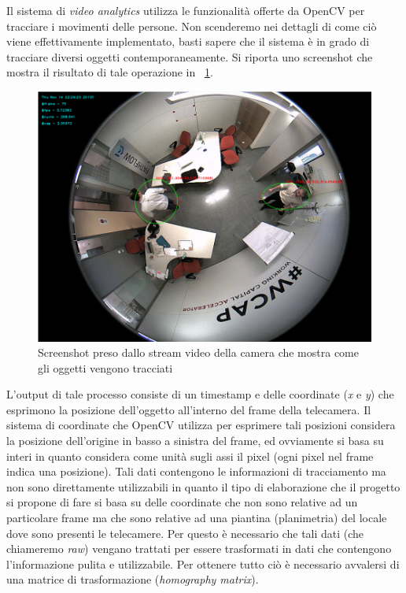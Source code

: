 Il sistema di \textit{video analytics} utilizza le funzionalità offerte da OpenCV per tracciare i movimenti delle persone. Non scenderemo nei dettagli di come ciò viene effettivamente implementato, basti sapere che il sistema è in grado di tracciare diversi oggetti contemporaneamente. Si riporta uno screenshot che mostra il risultato di tale operazione in ~\ref{fig:track1}.
\begin{figure}[htpb] 
\centering 
\includegraphics[scale=0.4]{./images/track1.png} 
\caption{Screenshot preso dallo stream video della camera che mostra come gli oggetti vengono tracciati} 
\label{fig:track1}
\end{figure} 
 L'output di tale processo consiste di un timestamp e delle coordinate (\textit{x} e \textit{y}) che esprimono la posizione dell'oggetto all'interno del frame della telecamera. Il sistema di coordinate che OpenCV utilizza per esprimere tali posizioni considera la posizione dell'origine in basso a sinistra del frame, ed ovviamente si basa su interi in quanto considera come unità sugli assi il pixel (ogni pixel nel frame indica una posizione).
Tali dati contengono le informazioni di tracciamento ma non sono direttamente utilizzabili in quanto il tipo di elaborazione che il progetto si propone di fare si basa su delle coordinate che non sono relative ad un particolare frame ma che sono relative ad una piantina (planimetria) del locale dove sono presenti le telecamere. Per questo è necessario che tali dati (che chiameremo \textit{raw}) vengano trattati per essere trasformati in dati che contengono l'informazione pulita e utilizzabile. Per ottenere tutto ciò è necessario avvalersi di una matrice di trasformazione (\textit{homography matrix}).
